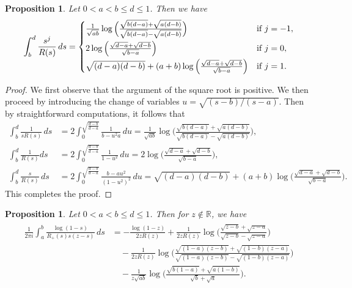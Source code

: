\documentclass{amsart}
\def\R{\mathbb{R}}
\theoremstyle{plain}
\newtheorem{prop}[thm]{Proposition}
\theoremstyle{remark}
\numberwithin{equation}{section}
\begin{document}
 

    \begin{prop} \label{Prop_int evaluation 2}
    Let $0<a<b \le d \le 1$. Then we have 
    \begin{equation}
       \int_b^d \frac{s^j}{R(s)}\, ds = \begin{cases}
            \frac{1}{\sqrt{ab}} \log\Big( \frac{\sqrt{b(d-a)} + \sqrt{a(d-b)}}{\sqrt{b(d-a)} - \sqrt{a(d-b)}}\Big) &\textup{if } j=-1, 
            \smallskip 
            \\
            2 \log \Big(\frac{\sqrt{d-a}+\sqrt{d-b}}{\sqrt{b-a}}\Big)  &\textup{if } j=0, 
            \smallskip 
            \\
    \sqrt{(d-a) (d-b)}+(a+b) \log \Big(\frac{\sqrt{d-a}+\sqrt{d-b}}{\sqrt{b-a}}\Big) &\textup{if } j=1. 
        \end{cases}
    \end{equation}
\end{prop}
\begin{proof}
We first observe that the argument of the square root is positive. We then proceed by introducing the change of variables $u=\sqrt{(s-b)/(s-a)}$. Then by straightforward computations, it follows that 
\begin{align}
      \int_b^d \frac{1}{sR(s)}\,ds &= 2\int_0^{\sqrt{\frac{d-b}{d-a}}} \frac{1}{b-u^2a}\,du = \tfrac{1}{\sqrt{ab}} \log\Big( \tfrac{\sqrt{b(d-a)} + \sqrt{a(d-b)}}{\sqrt{b(d-a)} - \sqrt{a(d-b)}}\Big), 
      \\
    \int_b^d \frac{1}{R(s)}ds &= 2\int_0^{\sqrt{\frac{d-b}{d-a}}} \frac{1}{1-u^2}\, du =  2\log \Big(\tfrac{\sqrt{d-a}+\sqrt{d-b}}{\sqrt{b-a}}\Big),
    \\
      \int_b^d \frac{s}{R(s)} \,ds &= 2\int_0^{\sqrt{\frac{d-b}{d-a}}} \frac{b-au^2}{(1-u^2)^2}\, du = \sqrt{(d-a) (d-b)}+(a+b) \log \Big(\tfrac{\sqrt{d-a}+\sqrt{d-b}}{\sqrt{b-a}}\Big). 
\end{align}
This completes the proof. 
\end{proof}

\begin{prop} \label{Prop_int evaluation 3}
   Let $0<a<b \le d \le 1$. Then for $z\not\in \R$, we have 
\begin{align}
\begin{split}
\frac{1}{2\pi i}\int_a^b \frac{\log(1-s)}{R_+(s)s(z-s)} \, ds  &= -\frac{\log(1-z)}{2zR(z)} + \frac{1}{ 2 z R(z)}\log\bigg( \frac{ \sqrt{ z-b} + \sqrt{z-a} }{ \sqrt{ z-b} -\sqrt{ z-a} }\bigg) 
\\
&\quad - \frac{1}{2 zR(z)}\log\bigg( \frac{ \sqrt{ (1 -a)(z-b) } + \sqrt{ (1-b)(z-a)} }{  \sqrt{(1-a)(z-b)} -\sqrt{ (1-b)(z-a)} }\bigg) 
\\
& \quad  - \frac{1}{z\sqrt{ab}} \log\bigg( \frac{\sqrt{b(1-a)} +\sqrt{a(1-b)}}{\sqrt{b} +\sqrt{a} }\bigg). 
\end{split}
\end{align} 
\end{prop}
 
\end{document}
